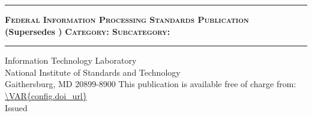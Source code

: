 \documentclass[12pt]{article}
\begin{document}
    \RaggedRight %


\begin{titlepage}

\sffamily

\LARGE{\textbf{}}
\vspace{8pt}
\hrule
\vspace{8pt}
\large{\textbf{\textsc{Federal Information Processing Standards Publication}}}\\
\small{\textbf{(Supersedes )}}
\vfill
\huge{\textbf{}}
\vfill
\normalsize{\textbf{\textsc{Category: \hfill Subcategory: }}}
\vspace{8pt}
\hrule
\vfill

Information Technology Laboratory\\
National Institute of Standards and Technology\\
Gaithersburg, MD 20899-8900
\vfill
\normalsize This publication is available free of charge from:\\
\url{\VAR{config.doi_url}}\\
\vfill
\normalsize Issued 
\vfill


\end{titlepage}
\end{document}
